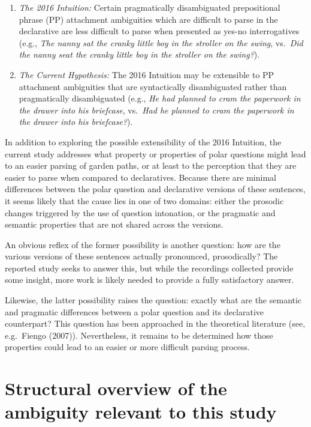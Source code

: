 \documentclass[11pt,oneside]{book}
\begin{document}
\begin{enumerate}
\def\labelenumi{(\arabic{enumi})}
\setcounter{enumi}{9}
\item
  \emph{The 2016 Intuition:} Certain pragmatically disambiguated prepositional phrase (PP) attachment ambiguities which are difficult to parse in the declarative are less difficult to parse when presented as yes-no interrogatives (e.g., \emph{The nanny sat the cranky little boy in the stroller on the swing}, vs.~\emph{Did the nanny seat the cranky little boy in the stroller on the swing?}).
\item
  \emph{The Current Hypothesis:} The 2016 Intuition may be extensible to PP attachment ambiguities that are syntactically disambiguated rather than pragmatically disambiguated (e.g., \emph{He had planned to cram the paperwork in the drawer into his briefcase}, vs.~\emph{Had he planned to cram the paperwork in the drawer into his briefcase?}).
\end{enumerate}

In addition to exploring the possible extensibility of the 2016 Intuition, the current study addresses what property or properties of polar questions might lead to an easier parsing of garden paths, or at least to the perception that they are easier to parse when compared to declaratives. Because there are minimal differences between the polar question and declarative versions of these sentences, it seems likely that the cause lies in one of two domains: either the prosodic changes triggered by the use of question intonation, or the pragmatic and semantic properties that are not shared across the versions.

An obvious reflex of the former possibility is another question: how are the various versions of these sentences actually pronounced, prosodically? The reported study seeks to answer this, but while the recordings collected provide some insight, more work is likely needed to provide a fully satisfactory answer.

Likewise, the latter possibility raises the question: exactly what are the semantic and pragmatic differences between a polar question and its declarative counterpart? This question has been approached in the theoretical literature (see, e.g.~Fiengo (2007)). Nevertheless, it remains to be determined how those properties could lead to an easier or more difficult parsing process.

\hypertarget{mech}{%
\section{Structural overview of the ambiguity relevant to this study}\label{mech}}
\end{document}

